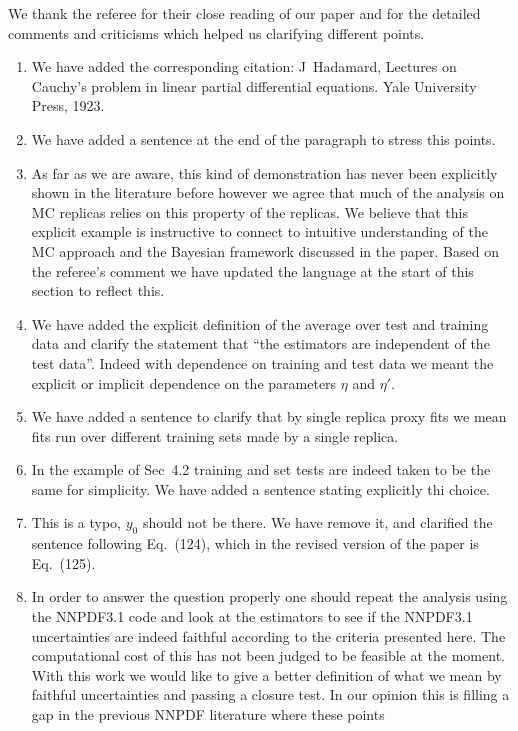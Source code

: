 \documentclass[11pt,a4paper]{article}
\numberwithin{equation}{section}
\numberwithin{figure}{section}
\numberwithin{table}{section}
\begin{document}
We thank the referee for their close reading of our paper and for the detailed comments and criticisms 
which helped us clarifying different points.
\begin{enumerate}
    \item We have added the corresponding citation: J~Hadamard, 
Lectures on Cauchy's problem in linear partial differential equations. Yale University Press, 1923.
    \item We have added a sentence at the end of the paragraph to stress this points.
    \item As far as we are aware, this kind of demonstration has never been explicitly
    shown in the literature before however we agree that much of the analysis on
    MC replicas relies on this property of the replicas. We believe that this explicit example
    is instructive to connect to intuitive understanding of the MC approach and
    the Bayesian framework discussed in the paper. Based on the referee's comment
    we have updated the language at the start of this section to reflect this.
    \item We have added the explicit definition of the average over test and training data and 
    clarify the statement that ``the estimators are independent of the test data''. Indeed with dependence
    on training and test data we meant the explicit or implicit dependence on the parameters $\eta$ and $\eta'$.
    \item We have added a sentence to clarify that by single replica proxy fits we mean fits
    run over different training sets made by a single replica. 
    \item In the example of Sec~4.2 training and set tests are indeed taken to be the same for simplicity.
    We have added a sentence stating explicitly thi choice.
    \item This is a typo, $y_0$ should not be there. We have remove it, and clarified the sentence following Eq.~(124),
    which in the revised version of the paper is Eq.~(125).
    \item In order to answer the question properly one should repeat the analysis using the 
    NNPDF3.1 code and look at the estimators to see if the NNPDF3.1 uncertainties are indeed faithful according to 
    the criteria presented here.
    The computational cost of this has not been judged to be feasible at the moment.
    With this work we would like to give a better definition of what we mean by faithful 
    uncertainties and passing a closure test.
    In our opinion this is filling a gap in the previous NNPDF literature where these points 

\end{enumerate}
\end{document}
